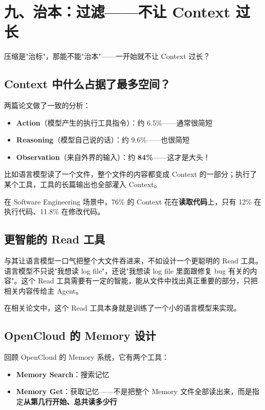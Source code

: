 \documentclass[12pt,a4paper]{article}
\begin{document}
\section{九、治本：过滤——不让 Context 过长}

压缩是"治标"，那能不能"治本"——一开始就不让 Context 过长？

\subsection{Context 中什么占据了最多空间？}

两篇论文做了一致的分析：

\begin{itemize}[leftmargin=2em]
  \item \textbf{Action}（模型产生的执行工具指令）：约 6.5\%——通常很简短
  \item \textbf{Reasoning}（模型自己说的话）：约 9.6\%——也很简短
  \item \textbf{Observation}（来自外界的输入）：约 \textbf{84\%}——这才是大头！
\end{itemize}

比如语言模型读了一个文件，整个文件的内容都变成 Context 的一部分；执行了某个工具，工具的长篇输出也全部灌入 Context。

在 Software Engineering 场景中，76\% 的 Context 花在\textbf{读取代码}上，只有 12\% 在执行代码、11.8\% 在修改代码。

\subsection{更智能的 Read 工具}

与其让语言模型一口气把整个大文件吞进来，不如设计一个更聪明的 Read 工具。语言模型不只说"我想读 log file"，还说"我想读 log file 里面跟修复 bug 有关的内容"。这个 Read 工具需要有一定的智能，能从文件中找出真正重要的部分，只把相关内容传给主 Agent。

在相关论文中，这个 Read 工具本身就是训练了一个小的语言模型来实现。

\subsection{OpenCloud 的 Memory 设计}

回顾 OpenCloud 的 Memory 系统，它有两个工具：

\begin{itemize}[leftmargin=2em]
  \item \textbf{Memory Search}：搜索记忆
  \item \textbf{Memory Get}：获取记忆——不是把整个 Memory 文件全部读出来，而是指定\textbf{从第几行开始、总共读多少行}
\end{itemize}
\end{document}
